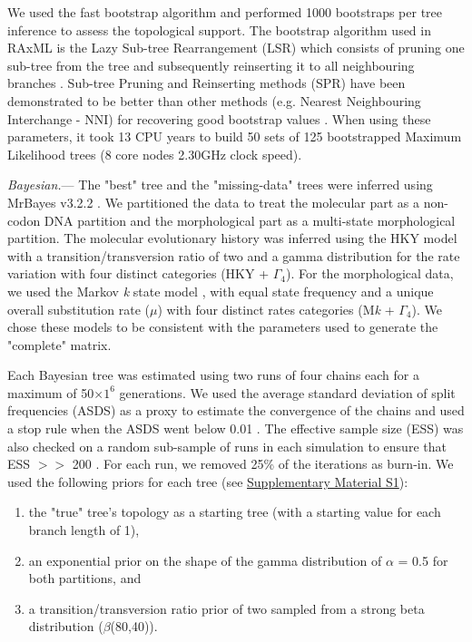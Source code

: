 \documentclass[12pt,letterpaper]{article}
\renewcommand{\subsubsection}[1]{%
\vspace{2ex}
\noindent
\textit{#1.}---}
\begin{document}
We used the fast bootstrap algorithm and performed 1000 bootstraps per tree inference to assess the topological support. %
The bootstrap algorithm used in RAxML is the Lazy Sub-tree Rearrangement (LSR) which consists of pruning one sub-tree from the tree and subsequently reinserting it to all neighbouring branches \citep{stamatakisa2008}.
Sub-tree Pruning and Reinserting methods (SPR) have been demonstrated to be better than other methods (e.g. Nearest Neighbouring Interchange - NNI) for recovering good bootstrap values \citep{salamin2003}.
When using these parameters, it took 13 CPU years to build 50 sets of 125 bootstrapped Maximum Likelihood trees (8 core nodes 2.30GHz clock speed).

\subsubsection{Bayesian}
The "best" tree and the "missing-data" trees were inferred using MrBayes v3.2.2 \citep{Ronquist2012mrbayes}.
We partitioned the data to treat the molecular part as a non-codon DNA partition and the morphological part as a multi-state morphological partition.
The molecular evolutionary history was inferred using the HKY model with a transition/transversion ratio of two \citep{douadycomparison2003} and a gamma distribution for the rate variation with four distinct categories (HKY + $\Gamma_4$).
For the morphological data, we used the Markov \textit{k} state model \citep{lewisa2001}, with equal state frequency and a unique overall substitution rate ($\mu$) with four distinct rates categories (M\textit{k} + $\Gamma_4$).
We chose these models to be consistent with the parameters used to generate the "complete" matrix.

Each Bayesian tree was estimated using two runs of four chains each for a maximum of 50$\times$$1^6$ generations.
We used the average standard deviation of split frequencies (ASDS) as a proxy to estimate the convergence of the chains and used a stop rule when the ASDS went below 0.01 \citep{Ronquist2012mrbayes}.
The effective sample size (ESS) was also checked on a random sub-sample of runs in each simulation to ensure that ESS $>>$ 200 \citep{drummond2006ess}.
For each run, we removed 25\% of the iterations as burn-in.
We used the following priors for each tree (see \hyperref[SupplementaryMaterial]{Supplementary Material S1}):
\begin{enumerate}
\item the "true" tree’s topology as a starting tree (with a starting value for each branch length of 1),
\item an exponential prior on the shape of the gamma distribution of $\alpha$ = 0.5 for both partitions, and
\item a transition/transversion ratio prior of two sampled from a strong beta distribution ($\beta$(80,40)).
\end{enumerate}
\end{document}
